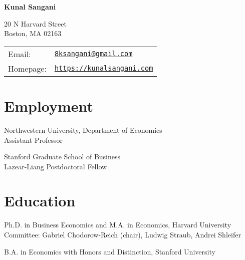 \documentclass[letterpaper]{article}
\def\name{Kunal Sangani}
\begin{document}
{\Large \textbf{\name}}


\vspace{0.25in}

\begin{minipage}{0.45\linewidth}
  20 N Harvard Street  \\
  Boston, MA 02163
\end{minipage}
\begin{minipage}{0.45\linewidth}
  \begin{tabular}{ll}
    Email: & \href{mailto:8ksangani@gmail.com}{\tt 8ksangani@gmail.com} \\
    Homepage: & \href{https://kunalsangani.com}{\tt https://kunalsangani.com} \\
  \end{tabular}
\end{minipage}

\section*{Employment}
\begin{description}[labelindent=0pt, labelwidth=1in, labelsep*=1em, leftmargin =!, font=\normalfont]
\item[2025--] Northwestern University, Department of Economics\\
Assistant Professor
\item[2024--2025] Stanford Graduate School of Business\\
Lazear-Liang Postdoctoral Fellow
\end{description}

\section*{Education}
\begin{description}[labelindent=0pt, labelwidth=1in, labelsep*=1em, leftmargin =!, font=\normalfont]
\item[2019--2024] Ph.D. in Business Economics and M.A. in Economics, Harvard University\\
Committee: Gabriel Chodorow-Reich (chair), Ludwig Straub, Andrei Shleifer
\item[2012--2016] B.A. in Economics {with Honors and Distinction}, Stanford University\\
\end{description}
\end{document}
